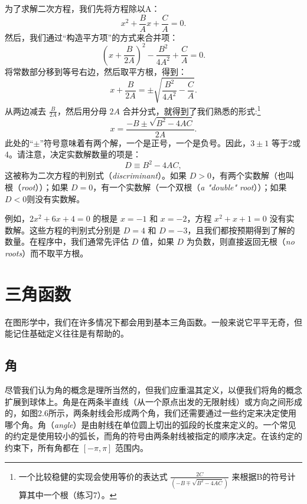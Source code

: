 \documentclass[lang=cn,12pt,marginpar=margintrue]{elegantbook}
\begin{document}
为了求解二次方程，我们先将方程除以A：
\[
  x^2+\frac{B}{A} x+\frac{C}{A}=0.
\]
然后，我们通过“构造平方项”的方式来合并项：
\[
  \left(x+\frac{B}{2 A}\right)^{2}-\frac{B^{2}}{4 A^{2}}+\frac{C}{A}=0.
\]
将常数部分移到等号右边，然后取平方根，得到：
\[
  x+\frac{B}{2 A}=\pm \sqrt{\frac{B^{2}}{4 A^{2}}-\frac{C}{A}}.
\]
从两边减去 $\frac{B}{2 A}$，然后用分母 $2A$ 合并分式，就得到了我们熟悉的形式:\footnote[1]{一个比较稳健的实现会使用等价的表达式 $\frac{2C}{\left(-B \mp \sqrt{B^{2}-4 A C}\right)}$ 来根据B的符号计算其中一个根（练习7）。}
\begin{equation}
  x=\frac{-B \pm \sqrt{B^{2}-4AC}}{2A}.
\end{equation}
此处的“$\pm$”符号意味着有两个解，一个是正号，一个是负号。因此，$3\pm1$ 等于2或4。请注意，决定实数解数量的项是：
\[
  D \equiv B^{2}-4AC,
\]
这被称为二次方程的判别式（\textit{discriminant}）。如果 $D>0$，有两个实数解（也叫根（\textit{root}））；如果 $D=0$，有一个实数解（一个双根（\textit{a "double" root}））；如果 $D<0$则没有实数解。

例如，$2x^2+6x+4=0$ 的根是 $x=-1$ 和 $x=-2$，方程 $x^2+x+1=0$ 没有实数解。这些方程的判别式分别是 $D=4$ 和 $D=-3$，且我们都按预期得到了解的数量。在程序中，我们通常先评估 $D$ 值，如果 $D$ 为负数，则直接返回无根（\textit{no roots}）而不取平方根。

\section{三角函数}

在图形学中，我们在许多情况下都会用到基本三角函数。一般来说它平平无奇，但能记住基础定义往往是有帮助的。

\subsection{角}


尽管我们认为角的概念是理所当然的，但我们应重温其定义，以便我们将角的概念扩展到球体上。角是在两条半直线（从一个原点出发的无限射线）或方向之间形成的，如图2.6所示，两条射线会形成两个角，我们还需要通过一些约定来决定使用哪个角。角（\textit{angle}）是由射线在单位圆上切出的弧段的长度来定义的。一个常见的约定是使用较小的弧长，而角的符号由两条射线被指定的顺序决定。在该约定的约束下，所有角都在 $[-\pi, \pi]$ 范围内。
\end{document}
